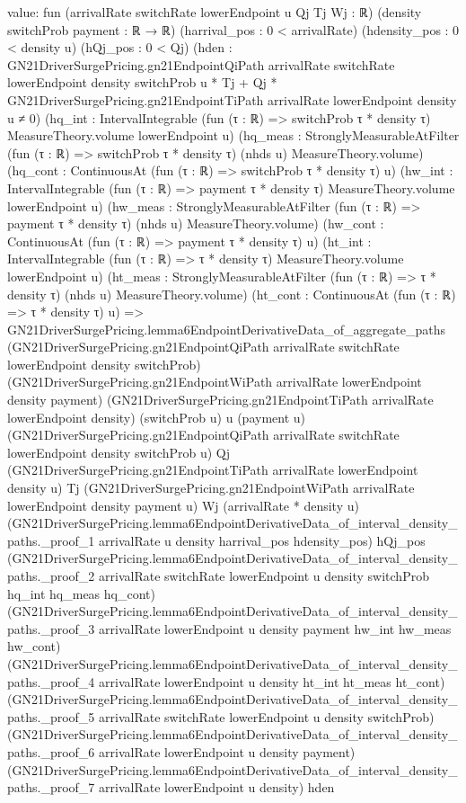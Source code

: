 \documentclass[10pt]{article}
\begin{document}
\begin{ReviewVerbatim}
value:
fun (arrivalRate switchRate lowerEndpoint u Qj Tj Wj : ℝ) (density switchProb payment : ℝ → ℝ)
    (harrival_pos : 0 < arrivalRate) (hdensity_pos : 0 < density u) (hQj_pos : 0 < Qj)
    (hden :
      GN21DriverSurgePricing.gn21EndpointQiPath arrivalRate switchRate lowerEndpoint density switchProb u * Tj +
          Qj * GN21DriverSurgePricing.gn21EndpointTiPath arrivalRate lowerEndpoint density u ≠
        0)
    (hq_int : IntervalIntegrable (fun (τ : ℝ) => switchProb τ * density τ) MeasureTheory.volume lowerEndpoint u)
    (hq_meas : StronglyMeasurableAtFilter (fun (τ : ℝ) => switchProb τ * density τ) (nhds u) MeasureTheory.volume)
    (hq_cont : ContinuousAt (fun (τ : ℝ) => switchProb τ * density τ) u)
    (hw_int : IntervalIntegrable (fun (τ : ℝ) => payment τ * density τ) MeasureTheory.volume lowerEndpoint u)
    (hw_meas : StronglyMeasurableAtFilter (fun (τ : ℝ) => payment τ * density τ) (nhds u) MeasureTheory.volume)
    (hw_cont : ContinuousAt (fun (τ : ℝ) => payment τ * density τ) u)
    (ht_int : IntervalIntegrable (fun (τ : ℝ) => τ * density τ) MeasureTheory.volume lowerEndpoint u)
    (ht_meas : StronglyMeasurableAtFilter (fun (τ : ℝ) => τ * density τ) (nhds u) MeasureTheory.volume)
    (ht_cont : ContinuousAt (fun (τ : ℝ) => τ * density τ) u) =>
  GN21DriverSurgePricing.lemma6EndpointDerivativeData_of_aggregate_paths
    (GN21DriverSurgePricing.gn21EndpointQiPath arrivalRate switchRate lowerEndpoint density switchProb)
    (GN21DriverSurgePricing.gn21EndpointWiPath arrivalRate lowerEndpoint density payment)
    (GN21DriverSurgePricing.gn21EndpointTiPath arrivalRate lowerEndpoint density) (switchProb u) u (payment u)
    (GN21DriverSurgePricing.gn21EndpointQiPath arrivalRate switchRate lowerEndpoint density switchProb u) Qj
    (GN21DriverSurgePricing.gn21EndpointTiPath arrivalRate lowerEndpoint density u) Tj
    (GN21DriverSurgePricing.gn21EndpointWiPath arrivalRate lowerEndpoint density payment u) Wj (arrivalRate * density u)
    (GN21DriverSurgePricing.lemma6EndpointDerivativeData_of_interval_density_paths._proof_1 arrivalRate u density
      harrival_pos hdensity_pos)
    hQj_pos
    (GN21DriverSurgePricing.lemma6EndpointDerivativeData_of_interval_density_paths._proof_2 arrivalRate switchRate
      lowerEndpoint u density switchProb hq_int hq_meas hq_cont)
    (GN21DriverSurgePricing.lemma6EndpointDerivativeData_of_interval_density_paths._proof_3 arrivalRate lowerEndpoint u
      density payment hw_int hw_meas hw_cont)
    (GN21DriverSurgePricing.lemma6EndpointDerivativeData_of_interval_density_paths._proof_4 arrivalRate lowerEndpoint u
      density ht_int ht_meas ht_cont)
    (GN21DriverSurgePricing.lemma6EndpointDerivativeData_of_interval_density_paths._proof_5 arrivalRate switchRate
      lowerEndpoint u density switchProb)
    (GN21DriverSurgePricing.lemma6EndpointDerivativeData_of_interval_density_paths._proof_6 arrivalRate lowerEndpoint u
      density payment)
    (GN21DriverSurgePricing.lemma6EndpointDerivativeData_of_interval_density_paths._proof_7 arrivalRate lowerEndpoint u
      density)
    hden
\end{ReviewVerbatim}
\end{document}
